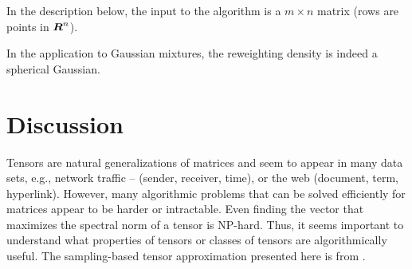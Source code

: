 \documentclass{book}
\numberwithin{exercise}{chapter}
\begin{document}

In the description below, the input to the algorithm is a $m \times n$ matrix (rows are points in $\mbox{\mbox{\boldmath $R$}}^n$).

\begin{center}
\end{center}

In the application to Gaussian mixtures, the reweighting density is indeed a spherical Gaussian.


\section{Discussion}
Tensors are natural generalizations of matrices and seem to appear in many data sets, e.g., network traffic -- (sender, receiver, time), or the web (document, term, hyperlink). However, many algorithmic problems that can be solved efficiently for matrices appear to be harder or intractable. Even finding the vector that maximizes the spectral norm of a tensor is NP-hard. Thus, it seems important to understand what properties of tensors or classes of tensors are algorithmically useful. The sampling-based tensor approximation presented here is from \cite{FKKV05}.
\end{document}

